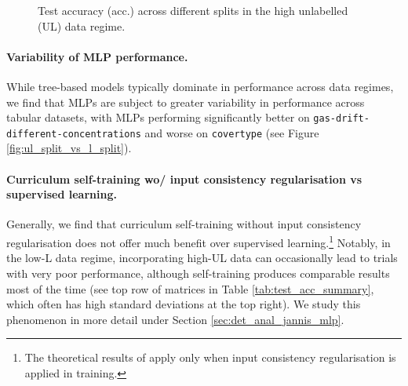 \documentclass{article}
\begin{document}
\begin{figure}[htbp]
  \centering
  
  
  
  
  \caption{
    Test accuracy (acc.) across different splits in the high unlabelled (UL) data regime.
  }
  \label{fig:test_acc_vs_ul_split_high}
\end{figure}

\paragraph{Variability of MLP performance.}
While tree-based models typically dominate in performance across data regimes, we find
that MLPs are subject to greater variability in performance across tabular datasets,
with MLPs performing significantly better on \texttt{gas-drift-different-concentrations}
and worse on \texttt{covertype} (see Figure \ref{fig:ul_split_vs_l_split}).

\paragraph{Curriculum self-training wo/ input consistency regularisation vs supervised
learning.}
Generally, we find that curriculum self-training without input consistency
regularisation does not offer much benefit over supervised learning.\footnote{%
  The theoretical results of \cite{wei2022theoretical} apply only when input consistency
  regularisation is applied in training.
}
Notably, in the low-L data regime, incorporating high-UL data can occasionally lead to
trials with very poor performance, although self-training produces comparable results
most of the time (see top row of matrices in Table \ref{tab:test_acc_summary}, which
often has high standard deviations at the top right).
We study this phenomenon in more detail under Section \ref{sec:det_anal_jannis_mlp}.

\clearpage
\end{document}
